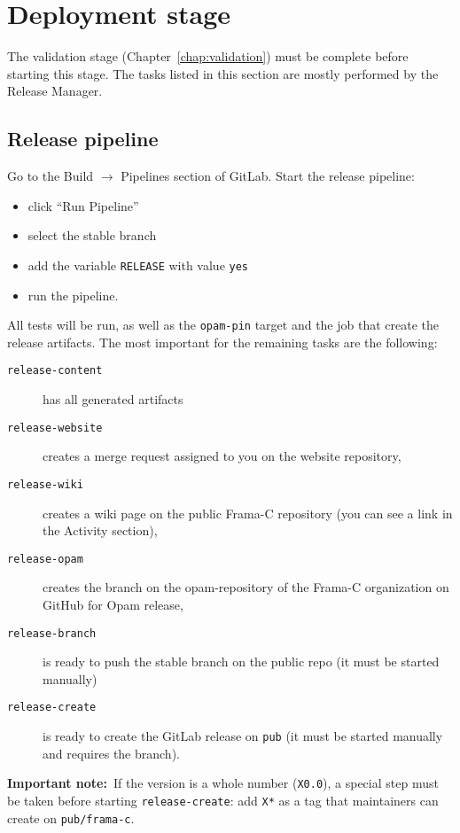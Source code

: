 \chapter{Deployment stage}
\label{chap:deploy}

The validation stage (Chapter~\ref{chap:validation}) must be complete before
starting this stage. The tasks listed in this section are mostly performed by
the Release Manager.

\section{Release pipeline}
\label{sec:release-pipeline}

Go to the Build $\rightarrow$ Pipelines section of GitLab. Start the release pipeline:
\begin{itemize}
  \item click ``Run Pipeline''
  \item select the stable branch
  \item add the variable \texttt{RELEASE} with value \texttt{yes}
  \item run the pipeline.
\end{itemize}

All tests will be run, as well as the \texttt{opam-pin} target and the job that
create the release artifacts. The most important for the remaining tasks are the
following:
\begin{description}
\item[\texttt{release-content}] has all generated artifacts
\item[\texttt{release-website}] creates a merge request assigned to
  you on the website repository,
\item[\texttt{release-wiki}] creates a wiki page on the public
  Frama-C repository (you can see a link in the Activity section),
\item[\texttt{release-opam}] creates the branch on the opam-repository
  of the Frama-C organization on GitHub for Opam release,
\item[\texttt{release-branch}] is ready to push the stable branch on
  the public repo (it must be started manually)
\item[\texttt{release-create}] is ready to create the GitLab release
  on \texttt{pub} (it must be started manually and requires the branch).
\end{description}

\textbf{Important note:}~If the version is a whole number (\texttt{X0.0}),
a special step must be taken before starting \texttt{release-create}: add
\texttt{X*} as a tag that maintainers can create on \texttt{pub/frama-c}.

